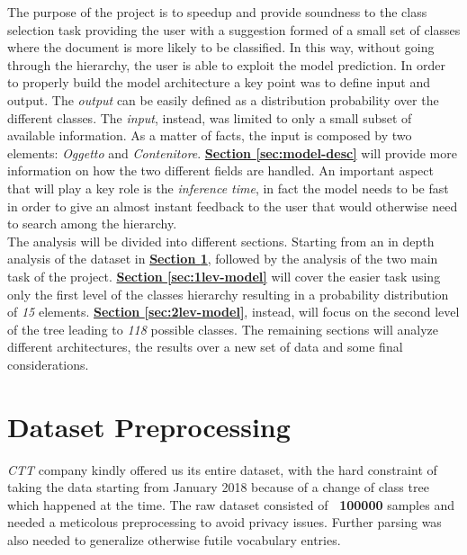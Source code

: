 \documentclass[12pt]{article}
\begin{document}
The purpose of the project is to speedup and provide soundness to the class selection task providing the user with a suggestion formed of a small set of classes where the document is more likely to be classified.
In this way, without going through the hierarchy, the user is able to exploit the model prediction.
In order to properly build the model architecture a key point was to define input and output. The \textit{output} can be easily defined as a distribution probability over the different classes. The \textit{input}, instead, was limited to only a small subset of available information. As a matter of facts, the input is composed by two elements: \textit{Oggetto} and \textit{Contenitore}.
\hyperref[sec:model-desc]{\textbf{Section \ref{sec:model-desc}}} will provide more information on how the two different fields are handled. An important aspect that will play a key role is the \textit{inference time}, in fact the model needs to be fast in order to give an almost instant feedback to the user that would otherwise need to search among the hierarchy.\\

The analysis will be divided into different sections. Starting from an in depth analysis of the dataset in \hyperref[sec:dataset]{\textbf{Section \ref{sec:dataset}}}, followed by the analysis of the two main task of the project. \hyperref[sec:1lev-model]{\textbf{Section \ref{sec:1lev-model}}} will cover the easier task using only the first level of the classes hierarchy resulting in a probability distribution of \textit{15} elements. \hyperref[sec:2lev-model]{\textbf{Section \ref{sec:2lev-model}}}, instead, will focus on the second level of the tree leading to \textit{118} possible classes. The remaining sections will analyze different architectures, the results over a new set of data and some final considerations.

\section{Dataset Preprocessing}\label{sec:dataset}
\textit{CTT} company kindly offered us its entire dataset, with the hard constraint of taking the data starting from January 2018 because of a change of class tree which happened at the time. The raw dataset consisted of \textbf{~100000} samples and needed a meticolous preprocessing to avoid privacy issues. Further parsing was also needed to generalize otherwise futile vocabulary entries.
\end{document}
